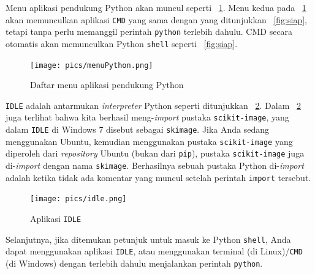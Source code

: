 Menu aplikasi pendukung Python akan muncul seperti \figurename~\ref{fig:menu}. Menu kedua pada \figurename~\ref{fig:menu} akan memunculkan aplikasi \texttt{CMD} yang sama dengan yang ditunjukkan \figurename~\ref{fig:siap}, tetapi tanpa perlu memanggil perintah \texttt{python} terlebih dahulu. CMD secara otomatis akan memunculkan Python \texttt{shell} seperti \figurename~\ref{fig:siap}.

\begin{figure}[h!]
  \begin{center}
    \texttt{[image: pics/menuPython.png]}
    \caption{Daftar menu aplikasi pendukung Python}
    \label{fig:menu}
  \end{center}
\end{figure}

\texttt{IDLE} adalah antarmukan \textit{interpreter} Python seperti ditunjukkan \figurename~\ref{fig:idle}. Dalam \figurename~\ref{fig:idle} juga terlihat bahwa kita berhasil meng-\textit{import} pustaka \texttt{scikit-image}, yang dalam \texttt{IDLE} di Windows 7 disebut sebagai \texttt{skimage}. Jika Anda sedang menggunakan Ubuntu, kemudian menggunakan pustaka \texttt{scikit-image} yang diperoleh dari \textit{repository} Ubuntu (bukan dari \texttt{pip}), pustaka \texttt{scikit-image} juga di-\textit{import} dengan nama \texttt{skimage}. Berhasilnya sebuah pustaka Python di-\textit{import} adalah ketika tidak ada komentar yang muncul setelah perintah \texttt{import} tersebut.

\begin{figure}
  \begin{center}
    \texttt{[image: pics/idle.png]}
    \caption{Aplikasi \texttt{IDLE}}
    \label{fig:idle}
  \end{center}
\end{figure}

Selanjutnya, jika ditemukan petunjuk untuk masuk ke Python \texttt{shell}, Anda dapat menggunakan aplikasi \texttt{IDLE}\texttt{}, atau menggunakan terminal (di Linux)/\texttt{CMD} (di Windows) dengan terlebih dahulu menjalankan perintah \texttt{python}.
